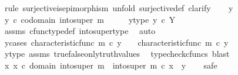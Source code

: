 \begin{isabellebody}
%
\isadelimproof
%
\endisadelimproof
%
\isatagproof
{}\isamarkupfalse%
\ {\isacharparenleft}{\kern0pt}rule\ surjective{\isacharunderscore}{\kern0pt}is{\isacharunderscore}{\kern0pt}epimorphism{\isacharcomma}{\kern0pt}\ unfold\ surjective{\isacharunderscore}{\kern0pt}def{\isacharcomma}{\kern0pt}\ clarify{\isacharparenright}{\kern0pt}\isanewline
\ \ \isamarkupfalse%
\ y\isanewline
\ \ \isamarkupfalse%
\ {\isachardoublequoteopen}y\ {\isasymin}\isactrlsub c\ codomain\ {\isacharparenleft}{\kern0pt}into{\isacharunderscore}{\kern0pt}super\ m{\isacharparenright}{\kern0pt}{\isachardoublequoteclose}\isanewline
\ \ \isamarkupfalse%
\ \isamarkupfalse%
\ y{\isacharunderscore}{\kern0pt}type{\isacharcolon}{\kern0pt}\ {\isachardoublequoteopen}y\ {\isasymin}\isactrlsub c\ Y{\isachardoublequoteclose}\isanewline
\ \ \ \ \isamarkupfalse%
\ assms\ cfunc{\isacharunderscore}{\kern0pt}type{\isacharunderscore}{\kern0pt}def\ into{\isacharunderscore}{\kern0pt}super{\isacharunderscore}{\kern0pt}type\ \isamarkupfalse%
\ auto\isanewline
\isanewline
\ \ \isamarkupfalse%
\ y{\isacharunderscore}{\kern0pt}cases{\isacharcolon}{\kern0pt}\ {\isachardoublequoteopen}{\isacharparenleft}{\kern0pt}characteristic{\isacharunderscore}{\kern0pt}func\ m\ {\isasymcirc}\isactrlsub c\ y\ {\isacharequal}{\kern0pt}\ {\isasymt}{\isacharparenright}{\kern0pt}\ {\isasymor}\ {\isacharparenleft}{\kern0pt}characteristic{\isacharunderscore}{\kern0pt}func\ m\ {\isasymcirc}\isactrlsub c\ y\ {\isacharequal}{\kern0pt}\ {\isasymf}{\isacharparenright}{\kern0pt}{\isachardoublequoteclose}\isanewline
\ \ \ \ \isamarkupfalse%
\ y{\isacharunderscore}{\kern0pt}type\ assms\ true{\isacharunderscore}{\kern0pt}false{\isacharunderscore}{\kern0pt}only{\isacharunderscore}{\kern0pt}truth{\isacharunderscore}{\kern0pt}values\ \isamarkupfalse%
\ {\isacharparenleft}{\kern0pt}typecheck{\isacharunderscore}{\kern0pt}cfuncs{\isacharcomma}{\kern0pt}\ blast{\isacharparenright}{\kern0pt}\isanewline
\ \ \isamarkupfalse%
\ \isamarkupfalse%
\ {\isachardoublequoteopen}{\isasymexists}x{\isachardot}{\kern0pt}\ x\ {\isasymin}\isactrlsub c\ domain\ {\isacharparenleft}{\kern0pt}into{\isacharunderscore}{\kern0pt}super\ m{\isacharparenright}{\kern0pt}\ {\isasymand}\ into{\isacharunderscore}{\kern0pt}super\ m\ {\isasymcirc}\isactrlsub c\ x\ {\isacharequal}{\kern0pt}\ y{\isachardoublequoteclose}\isanewline
\ \ \isamarkupfalse%
\ safe\isanewline

\end{isabellebody}
